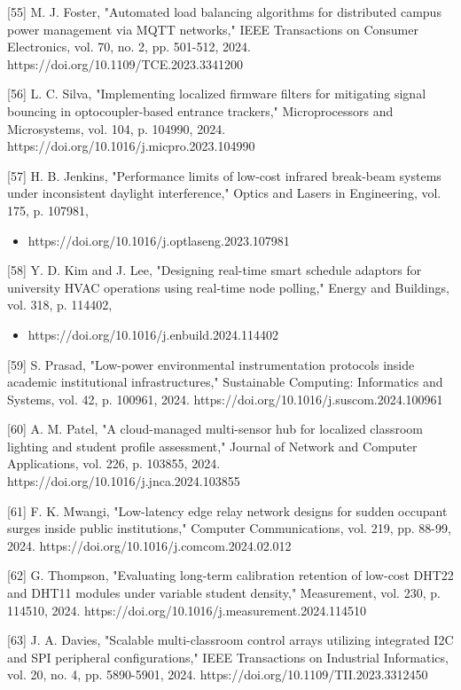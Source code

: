 [55] M. J. Foster, "Automated load balancing algorithms for distributed campus power
management via MQTT networks," IEEE Transactions on Consumer Electronics, vol. 70,
no. 2, pp. 501-512, 2024. https://doi.org/10.1109/TCE.2023.3341200

[56] L. C. Silva, "Implementing localized firmware filters for mitigating signal bouncing in
optocoupler-based entrance trackers," Microprocessors and Microsystems, vol. 104, p.
104990, 2024. https://doi.org/10.1016/j.micpro.2023.104990

[57] H. B. Jenkins, "Performance limits of low-cost infrared break-beam systems under
inconsistent daylight interference," Optics and Lasers in Engineering, vol. 175, p. 107981,
\begin{itemize}
  \item https://doi.org/10.1016/j.optlaseng.2023.107981
\end{itemize}

[58] Y. D. Kim and J. Lee, "Designing real-time smart schedule adaptors for university
HVAC operations using real-time node polling," Energy and Buildings, vol. 318, p. 114402,
\begin{itemize}
  \item https://doi.org/10.1016/j.enbuild.2024.114402
\end{itemize}

[59] S. Prasad, "Low-power environmental instrumentation protocols inside academic
institutional infrastructures," Sustainable Computing: Informatics and Systems, vol. 42, p.
100961, 2024. https://doi.org/10.1016/j.suscom.2024.100961

[60] A. M. Patel, "A cloud-managed multi-sensor hub for localized classroom lighting and
student profile assessment," Journal of Network and Computer Applications, vol. 226, p.
103855, 2024. https://doi.org/10.1016/j.jnca.2024.103855

[61] F. K. Mwangi, "Low-latency edge relay network designs for sudden occupant surges
inside public institutions," Computer Communications, vol. 219, pp. 88-99, 2024.
https://doi.org/10.1016/j.comcom.2024.02.012

[62] G. Thompson, "Evaluating long-term calibration retention of low-cost DHT22 and
DHT11 modules under variable student density," Measurement, vol. 230, p. 114510, 2024.
https://doi.org/10.1016/j.measurement.2024.114510




[63] J. A. Davies, "Scalable multi-classroom control arrays utilizing integrated I2C and SPI
peripheral configurations," IEEE Transactions on Industrial Informatics, vol. 20, no. 4, pp.
5890-5901, 2024. https://doi.org/10.1109/TII.2023.3312450

